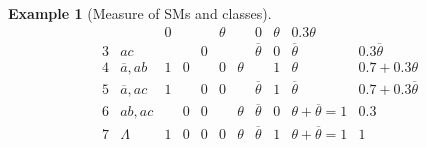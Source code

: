 \documentclass{tlp}
\newtheorem{example}{Example}
\newcommand{\co}[1]{\ensuremath{\overline{#1}}}     %
\newcommand{\bottomclass}{\ensuremath{\Lambda}}
\begin{document}
{\begin{example}[Measure of \aclp{SM} and classes]
\begin{equation*}
\begin{array}{c||l|ccc|ccc|c|c|r}
                &                                           & 0      &
                &                                           & \theta &
                & 0
                & \theta
                & 0.3\theta
              \\[2pt]
              3
                & ac
                &                                           &        & 0
                &                                           &        & \co{\theta}
                & 0
                & \co{\theta}
                & 0.3\co{\theta}
              \\[2pt]
              4
                & \co{a}, ab
                & 1                                         & 0      &
                & 0                                         & \theta &
                & 1
                & \theta
                & 0.7 + 0.3\theta
              \\[2pt]
              5
                & \co{a}, ac
                & 1                                         &        & 0
                & 0                                         &        & \co{\theta}
                & 1
                & \co{\theta}
                & 0.7 + 0.3\co{\theta}
              \\[2pt]
              6
                & ab, ac
                &                                           & 0      & 0
                &                                           & \theta & \co{\theta}
                & 0
                & \theta + \co{\theta} = 1
                & 0.3
              \\[2pt]
              7
                & \bottomclass
                & 1                                         & 0      & 0
                & 0                                         & \theta & \co{\theta}
                & 1
                & \theta + \co{\theta} = 1
                & 1
          \end{array}
      \end{equation*}


\end{example}}
\end{document}
